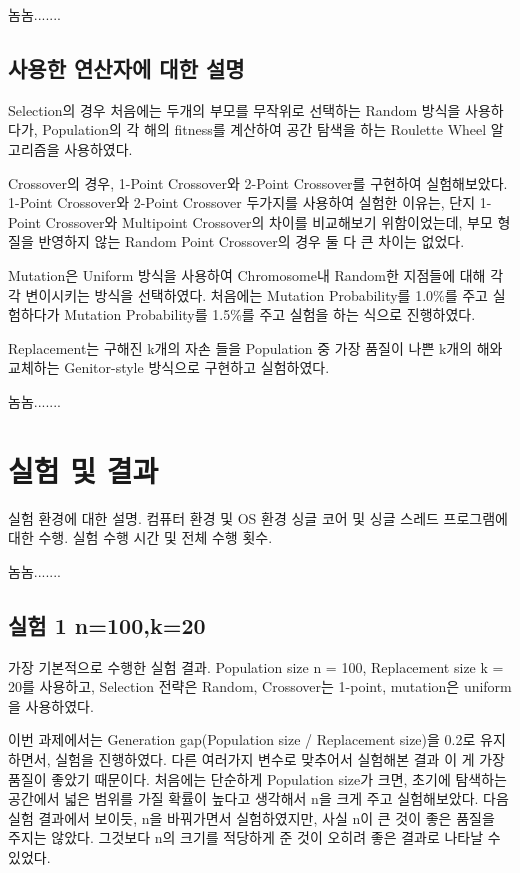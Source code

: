 \documentclass{article}
\begin{document}
놈놈.......

\subsection{ 사용한 연산자에 대한 설명 }

Selection의 경우 처음에는 두개의 부모를 무작위로 선택하는 Random 방식을 사용하다가, Population의 각 해의 fitness를 계산하여 공간 탐색을 하는 Roulette Wheel 알고리즘을 사용하였다.

Crossover의 경우, 1-Point Crossover와 2-Point Crossover를 구현하여 실험해보았다. 1-Point Crossover와 2-Point Crossover 두가지를 사용하여 실험한 이유는, 단지 1-Point Crossover와 Multipoint Crossover의 차이를 비교해보기 위함이었는데, 부모 형질을 반영하지 않는 Random Point Crossover의 경우 둘 다 큰 차이는 없었다.

Mutation은 Uniform 방식을 사용하여 Chromosome내 Random한 지점들에 대해 각각 변이시키는 방식을 선택하였다. 처음에는 Mutation Probability를 1.0\%를 주고 실험하다가 Mutation Probability를 1.5\%를 주고 실험을 하는 식으로 진행하였다.

Replacement는 구해진 k개의 자손 들을 Population 중 가장 품질이 나쁜 k개의 해와 교체하는 Genitor-style 방식으로 구현하고 실험하였다.

놈놈.......

\section{실험 및 결과}

실험 환경에 대한 설명. 
컴퓨터 환경 및 OS 환경 싱글 코어 및 싱글 스레드 프로그램에 대한 수행. 
실험 수행 시간 및 전체 수행 횟수.

놈놈.......

\subsection{실험 1 n=100,k=20}

가장 기본적으로 수행한 실험 결과. Population size n = 100, Replacement size k = 20를 사용하고, Selection 전략은 Random, Crossover는 1-point, mutation은 uniform 을 사용하였다.

이번 과제에서는 Generation gap(Population size / Replacement size)을 0.2로 유지하면서, 실험을 진행하였다. 다른 여러가지 변수로 맞추어서 실험해본 결과 이 게 가장 품질이 좋았기 때문이다. 처음에는 단순하게 Population size가 크면, 초기에 탐색하는 공간에서 넓은 범위를 가질 확률이 높다고 생각해서 n을 크게 주고 실험해보았다. 다음 실험 결과에서 보이듯, n을 바꿔가면서 실험하였지만, 사실 n이 큰 것이 좋은 품질을 주지는 않았다. 그것보다 n의 크기를 적당하게 준 것이 오히려 좋은 결과로 나타날 수 있었다.
\end{document}
